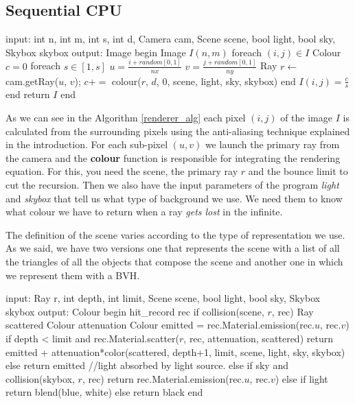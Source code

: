 \documentclass[titlepage,12pt]{report}
\begin{document}
\subsection{Sequential CPU}

\begin{algorithm}[caption={renderer sequential}, label={renderer_alg}]
input: int n, int m, int s, int d, Camera cam, Scene scene, bool light, bool sky, Skybox skybox
output: Image
begin
  Image $I(n,m)$
  foreach $(i,j) \in I$
    Colour $c = 0$
    foreach $s \in [1,s]$
      $u = \frac{i + random[0,1]}{nx}$
      $v = \frac{j + random[0,1]}{ny}$
      Ray $r \gets $ cam.getRay($u$, $v$);      
      $c += $ colour($r$, $d$, $0$, scene, light, sky, skybox)
    end
    $I(i,j) = \frac{c}{s}$
  end
  return $I$
end
\end{algorithm}

As we can see in the Algorithm \ref{renderer_alg} each pixel $(i,j)$ of the image $I$ is calculated from the surrounding pixels using the anti-aliasing technique explained in the introduction. For each sub-pixel $(u,v)$ we launch the primary ray from the camera and the \textbf{colour} function is responsible for integrating the rendering equation. For this, you need the scene, the primary ray $r$ and the bounce limit to cut the recursion. Then we also have the input parameters of the program \textit{light} and \textit{skybox} that tell us what type of background we use. We need them to know what colour we have to return when a ray \textit{gets lost} in the infinite.

The definition of the scene varies according to the type of representation we use. As we said, we have two versions one that represents the scene with a list of all the triangles of all the objects that compose the scene and another one in which we represent them with a BVH.

\begin{algorithm}[caption={colour recursive}, label={color_alg_rec}]
input: Ray r, int depth, int limit, Scene scene, bool light, bool sky, Skybox skybox
output: Colour
begin
  hit_record rec
  if collision(scene, $r$, rec)
    Ray scattered
    Colour attenuation
    Colour emitted = rec.Material.emission(rec.$u$, rec.$v$)
    if depth < limit and rec.Material.scatter($r$, rec, attenuation, scattered)
      return emitted + attenuation*color(scattered, depth+1, limit, scene, light, sky, skybox)
    else
      return emitted //light absorbed by light source.
  else
    if sky and collision(skybox, $r$, rec)
        return rec.Material.emission(rec.$u$, rec.$v$)
    else
      if light
        return blend(blue, white)
      else
        return black
end
\end{algorithm}
\end{document}
